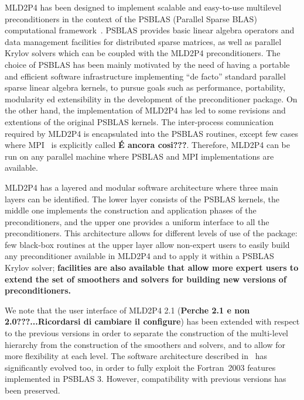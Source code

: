 MLD2P4 has been designed to implement scalable and easy-to-use
multilevel preconditioners in the context of the PSBLAS
(Parallel Sparse BLAS) computational framework~\cite{psblas_00,PSBLAS3}. 
PSBLAS provides basic linear algebra
operators and data management facilities for distributed sparse matrices,
as well as parallel Krylov solvers which can be coupled with the MLD2P4 preconditioners.
The choice of PSBLAS has been mainly motivated by the need of having
a portable and efficient software infrastructure implementing ``de facto'' standard
parallel sparse linear algebra kernels, to pursue goals such as performance,
portability, modularity ed extensibility in the development of the preconditioner
package. On the other hand, the implementation of MLD2P4 has led to some
revisions and extentions of the original PSBLAS kernels.
The inter-process comunication required
by MLD2P4 is encapsulated into the PSBLAS routines, except few cases where
MPI~\cite{MPI1} is explicitly called \textbf{\'E ancora cosi???}. Therefore, MLD2P4 can be run on any parallel
machine where PSBLAS and MPI implementations are available.

MLD2P4 has a layered and modular software architecture where three main layers can be identified. 
The lower layer consists of the PSBLAS kernels, the middle one implements
the construction and application phases of the preconditioners, and the upper one
provides a uniform interface to all the preconditioners. 
This architecture allows for different levels of use of the package:
few black-box routines at the upper layer allow non-expert users to easily
build any preconditioner available in MLD2P4 and to apply it within a PSBLAS Krylov solver;
{\bf facilities are also available that allow more expert users to extend the set of smoothers
and solvers for building new versions of preconditioners.}

We note that the user interface of MLD2P4 2.1 ({\bf Perche 2.1 e non 2.0???...Ricordarsi di cambiare il configure})
has been extended with respect to the previous versions 
in order to separate the construction
of the multi-level hierarchy from the construction of the smoothers and solvers, and to allow for more flexibility
at each level.
The software architecture described in~\cite{MLD2P4_TOMS} has significantly evolved too, in order to fully exploit the 
Fortran~2003 features implemented in PSBLAS 3.
However, compatibility with previous versions has been preserved.

